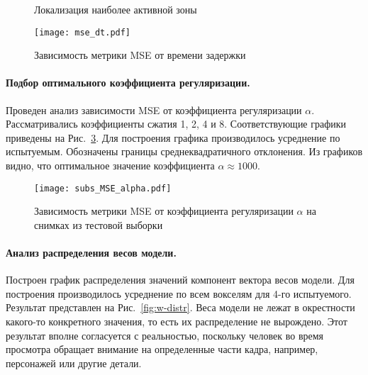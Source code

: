 \documentclass[a4paper, 12pt]{extarticle}
\begin{document}
\begin{figure}[h!]
	\centering
	\hfill
	\hfill
	\caption{Локализация наиболее активной зоны}
	\label{fig:local}
\end{figure}

\begin{figure}[h!]
	\centering
	\texttt{[image: mse\_dt.pdf]}
	\caption{Зависимость метрики MSE от времени задержки}
	\label{fig:mse-dt}
\end{figure}

\paragraph*{Подбор оптимального коэффициента регуляризации.}

Проведен анализ зависимости MSE от коэффициента регуляризации $\alpha$.
Рассматривались коэффициенты сжатия 1, 2, 4 и 8.
Соответствующие графики приведены на Рис.~\ref{fig:mse-alpha}.
Для построения графика производилось усреднение по испытуемым.
Обозначены границы среднеквадратичного отклонения.
Из графиков видно, что оптимальное значение коэффициента $\alpha \approx 1000$.

\begin{figure}[h!]
	\centering
	\texttt{[image: subs\_MSE\_alpha.pdf]}
	\caption{Зависимость метрики MSE от коэффициента регуляризации $\alpha$ на снимках из тестовой выборки}
	\label{fig:mse-alpha}
\end{figure}

\paragraph*{Анализ распределения весов модели.}

Построен график распределения значений компонент вектора весов модели.
Для построения производилось усреднение по всем вокселям для 4-го испытуемого.
Результат представлен на Рис.~\ref{fig:w-distr}.
Веса модели не лежат в окрестности какого-то конкретного значения, 
то есть их распределение не вырождено.
Этот результат вполне согласуется с реальностью, поскольку человек во время просмотра
обращает внимание на определенные части кадра, например, персонажей или
другие детали.
\end{document}
